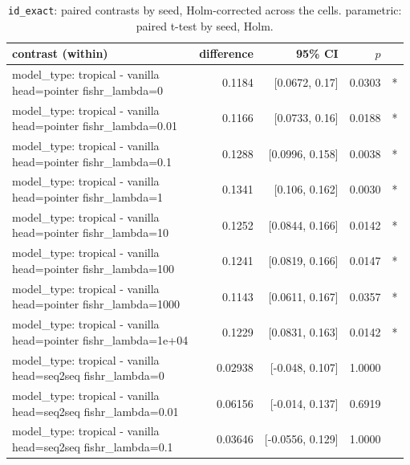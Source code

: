 \documentclass[10pt]{article}
\makeatletter
\newcommand{\stackcell}[1]{\begin{tabular}[t]{@{}l@{}}#1\end{tabular}}
\makeatother
\begin{document}
{\small
\begin{longtable}{lrrrl}
\caption{\texttt{id\_exact}: paired contrasts by seed, Holm-corrected across the cells. parametric: paired t-test by seed, Holm.}\label{tab:paired-id_exact}\\
\toprule
contrast (within) & difference & 95\% CI & $p$ & \\
\midrule
\endhead
\stackcell{model\_type: tropical - vanilla\\\footnotesize head=pointer fishr\_lambda=0 } & 0.1184 & [0.0672, 0.17] & 0.0303 & *\\
\stackcell{model\_type: tropical - vanilla\\\footnotesize head=pointer fishr\_lambda=0.01 } & 0.1166 & [0.0733, 0.16] & 0.0188 & *\\
\stackcell{model\_type: tropical - vanilla\\\footnotesize head=pointer fishr\_lambda=0.1 } & 0.1288 & [0.0996, 0.158] & 0.0038 & *\\
\stackcell{model\_type: tropical - vanilla\\\footnotesize head=pointer fishr\_lambda=1 } & 0.1341 & [0.106, 0.162] & 0.0030 & *\\
\stackcell{model\_type: tropical - vanilla\\\footnotesize head=pointer fishr\_lambda=10 } & 0.1252 & [0.0844, 0.166] & 0.0142 & *\\
\stackcell{model\_type: tropical - vanilla\\\footnotesize head=pointer fishr\_lambda=100 } & 0.1241 & [0.0819, 0.166] & 0.0147 & *\\
\stackcell{model\_type: tropical - vanilla\\\footnotesize head=pointer fishr\_lambda=1000 } & 0.1143 & [0.0611, 0.167] & 0.0357 & *\\
\stackcell{model\_type: tropical - vanilla\\\footnotesize head=pointer fishr\_lambda=1e+04 } & 0.1229 & [0.0831, 0.163] & 0.0142 & *\\
\stackcell{model\_type: tropical - vanilla\\\footnotesize head=seq2seq fishr\_lambda=0 } & 0.02938 & [-0.048, 0.107] & 1.0000 & \\
\stackcell{model\_type: tropical - vanilla\\\footnotesize head=seq2seq fishr\_lambda=0.01 } & 0.06156 & [-0.014, 0.137] & 0.6919 & \\
\stackcell{model\_type: tropical - vanilla\\\footnotesize head=seq2seq fishr\_lambda=0.1 } & 0.03646 & [-0.0556, 0.129] & 1.0000 & \\

\end{longtable}}
\end{document}
